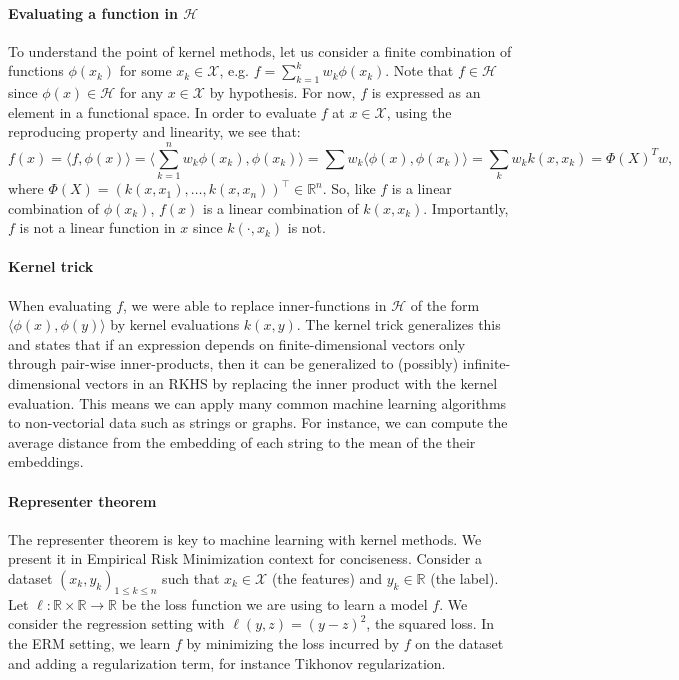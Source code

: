 \paragraph{Evaluating a function in $\mathcal H$}
To understand the point of kernel methods, let us consider a finite combination of functions $\phi(x_k)$ for some $x_k\in\mathcal X$, e.g. $f= \sum_{k=1}^k w_k \phi(x_k)$. Note that $f\in\mathcal H$ since $\phi(x)\in\mathcal H$ for any $x\in\mathcal X$ by hypothesis. For now, $f$ is expressed as an element in a functional space. In order to evaluate $f$ at $x\in\mathcal X$, using the reproducing property and linearity, we see that:
$$f(x) = \langle f, \phi(x)\rangle = \langle \sum_{k=1}^n w_k\phi(x_k), \phi(x_k)\rangle= \sum w_k \langle \phi(x), \phi(x_k)\rangle = \sum_{k}w_k k(x, x_k)= \Phi(X)^Tw,$$
where $\Phi(X) = (k(x, x_1), \ldots, k(x, x_n))^\top\in\mathbb R^n$. So, like $f$ is a linear combination of $\phi(x_k)$, $f(x)$ is a linear combination of $k(x, x_k)$. Importantly, $f$ is not a linear function in $x$ since $k(\cdot, x_k)$ is not.

\paragraph{Kernel trick}
When evaluating $f$, we were able to replace inner-functions in $\mathcal H$ of the form $\langle \phi(x), \phi(y)\rangle$ by kernel evaluations $k(x, y)$. The kernel trick generalizes this and states that if an expression depends on finite-dimensional vectors only through pair-wise inner-products, then it can be generalized to (possibly) infinite-dimensional vectors in an RKHS by replacing the inner product with the kernel evaluation. This means we can apply many common machine learning algorithms to non-vectorial data such as strings or graphs. For instance, we can compute the average distance from the embedding of each string to the mean of the their embeddings.

\paragraph{Representer theorem} The representer theorem is key to machine learning with kernel methods. We present it in Empirical Risk Minimization context for conciseness. Consider a dataset $(x_k, y_k)_{1\leq k\leq n}$ such that $x_k\in\mathcal X$ (the features) and $y_k\in\mathbb R$ (the label). Let $\ell: \mathbb R \times\mathbb R\to\mathbb R$ be the loss function we are using to learn a model $f$. We consider the regression setting with $\ell(y, z) = (y - z) ^2$, the squared loss. In the ERM setting, we learn $f$ by minimizing the loss incurred by $f$ on the dataset and adding a regularization term, for instance Tikhonov regularization.

